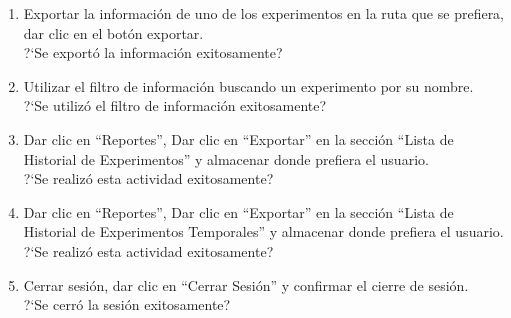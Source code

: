 \begin{enumerate}
	\item {Exportar la información de uno de los experimentos en la ruta que se prefiera, dar clic en el botón exportar.\\
			?`Se exportó la información exitosamente?
	}
	\item {Utilizar el filtro de información buscando un experimento por su nombre.\\
			?`Se utilizó el filtro de información exitosamente?
	}
	\item {Dar clic en ``Reportes'', Dar clic en ``Exportar'' en la sección ``Lista de Historial de Experimentos'' y almacenar donde prefiera el usuario.\\
			?`Se realizó esta actividad exitosamente?
	}
	\item {Dar clic en ``Reportes'', Dar clic en ``Exportar'' en la sección ``Lista de Historial de Experimentos Temporales'' y almacenar donde prefiera el usuario.\\
			?`Se realizó esta actividad exitosamente?
	}
	\item {Cerrar sesión, dar clic en ``Cerrar Sesión'' y confirmar el cierre de sesión.\\
			?`Se cerró la sesión exitosamente?
	}
\end{enumerate}
